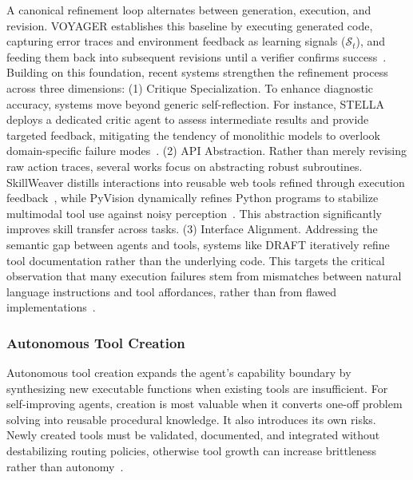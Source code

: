 A canonical refinement loop alternates between generation, execution, and revision. VOYAGER establishes this baseline by executing generated code, capturing error traces and environment feedback as learning signals ($\mathcal{S}_t$), and feeding them back into subsequent revisions until a verifier confirms success~\citep{wang2023voyageropenendedembodiedagent}. Building on this foundation, recent systems strengthen the refinement process across three dimensions: (1) Critique Specialization. To enhance diagnostic accuracy, systems move beyond generic self-reflection. For instance, STELLA deploys a dedicated critic agent to assess intermediate results and provide targeted feedback, mitigating the tendency of monolithic models to overlook domain-specific failure modes~\citep{jin2025stellaselfevolvingllmagent}. (2) API Abstraction. Rather than merely revising raw action traces, several works focus on abstracting robust subroutines. SkillWeaver distills interactions into reusable web tools refined through execution feedback~\citep{zheng2025skillweaverwebagentsselfimprove}, while PyVision dynamically refines Python programs to stabilize multimodal tool use against noisy perception~\citep{zhao2025pyvisionagenticvisiondynamic}. This abstraction significantly improves skill transfer across tasks. (3) Interface Alignment. Addressing the semantic gap between agents and tools, systems like DRAFT iteratively refine tool documentation rather than the underlying code. This targets the critical observation that many execution failures stem from mismatches between natural language instructions and tool affordances, rather than from flawed  implementations~\citep{qu2025explorationmasteryenablingllms}.


\subsubsection{Autonomous Tool Creation}
\label{sec:Autonomous_Tool_Creation}

Autonomous tool creation expands the agent's capability boundary by synthesizing new executable functions when existing tools are insufficient. For self-improving agents, creation is most valuable when it converts one-off problem solving into reusable procedural knowledge. It also introduces its own risks. Newly created tools must be validated, documented, and integrated without destabilizing routing policies, otherwise tool growth can increase brittleness rather than autonomy~\citep{gao2025surveyselfevolvingagentspath, qiu2025alitageneralistagentenabling}.

